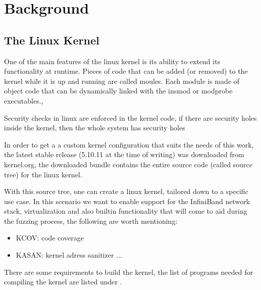\section{Background}

\subsection{The Linux Kernel}


One of the main features of the linux kernel is its ability to extend 
its functionality at runtime. Pieces of code that can be added (or removed) to the kernel 
while it is up and running are called moules. Each module is made of object code that can 
be dynamically linked with the insmod or modprobe executables.\cite{ldd3}, 

Security checks in linux are enforced in the kernel code, if there are security holes inside
the kernel, then the whole system has security holes \cite{ldd3}




In order to get a a custom kernel configuration that suits the needs of this work,
the latest stable release (5.10.11 at the time of writing) was downloaded from kernel.org,
the downloaded bundle contains the entire source code (called source tree) for the linux kernel.

With this source tree, one can create a linux kernel, tailored down to a specific use case. In 
this scenario we want to enable support for the InfiniBand network stack, virtualization and 
also builtin functionality that will come to aid during the fuzzing process, the following are worth
mentioning:

\begin{itemize}
    \item KCOV: code coverage %
    \item KASAN: kernel adress sanitizer ... %
\end{itemize}

There are some requirements to build the kernel, the list of programs needed for compiling the kernel are
listed under \cite{minreqskernel}.

